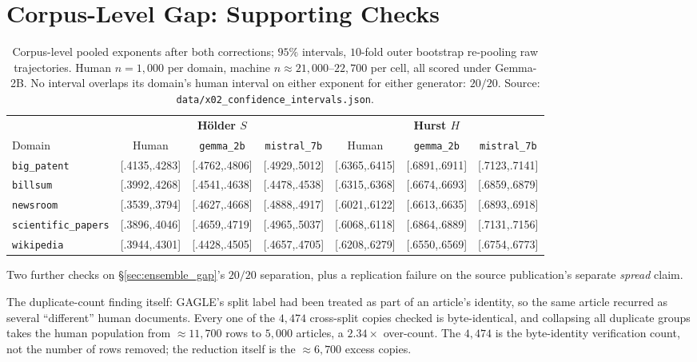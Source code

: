 \documentclass{article}
\newcommand{\Strue}{\ensuremath{S}}
\newcommand{\Htrue}{\ensuremath{H}}
\begin{document}
\section{Corpus-Level Gap: Supporting Checks}
\label{app:corpuschecks}

\begin{table}[h]
\centering
\caption{Corpus-level pooled exponents after both corrections; $95\%$ intervals,
$10$-fold outer bootstrap re-pooling raw trajectories. Human $n=1{,}000$ per domain,
machine $n\approx21{,}000$--$22{,}700$ per cell, all scored under Gemma-2B. No
interval overlaps its domain's human interval on either exponent for either
generator: $20/20$. Source: \texttt{data/x02\_confidence\_intervals.json}.}
\label{tab:x02}
\scriptsize
\setlength{\tabcolsep}{3.4pt}
\begin{tabular}{lccc@{\hskip 5mm}ccc}
\toprule
& \multicolumn{3}{c}{\textbf{H\"older \Strue}} & \multicolumn{3}{c}{\textbf{Hurst \Htrue}}\\
\cmidrule(lr){2-4}\cmidrule(lr){5-7}
Domain & Human & \texttt{gemma\_2b} & \texttt{mistral\_7b}
       & Human & \texttt{gemma\_2b} & \texttt{mistral\_7b}\\
\midrule
\texttt{big\_patent}       & [.4135,.4283] & [.4762,.4806] & [.4929,.5012] & [.6365,.6415] & [.6891,.6911] & [.7123,.7141]\\
\texttt{billsum}           & [.3992,.4268] & [.4541,.4638] & [.4478,.4538] & [.6315,.6368] & [.6674,.6693] & [.6859,.6879]\\
\texttt{newsroom}          & [.3539,.3794] & [.4627,.4668] & [.4888,.4917] & [.6021,.6122] & [.6613,.6635] & [.6893,.6918]\\
\texttt{scientific\_papers}& [.3896,.4046] & [.4659,.4719] & [.4965,.5037] & [.6068,.6118] & [.6864,.6889] & [.7131,.7156]\\
\texttt{wikipedia}         & [.3944,.4301] & [.4428,.4505] & [.4657,.4705] & [.6208,.6279] & [.6550,.6569] & [.6754,.6773]\\
\bottomrule
\end{tabular}
\end{table}


Two further checks on \S\ref{sec:ensemble_gap}'s $20/20$ separation, plus a
replication failure on the source publication's separate \emph{spread} claim.

The duplicate-count finding itself: GAGLE's split label had been treated as part of an
article's identity, so the same article recurred as several ``different''
human documents. Every one of the $4{,}474$ cross-split copies checked is
byte-identical, and collapsing all duplicate groups takes the human population
from $\approx11{,}700$ rows to $5{,}000$ articles, a $2.34\times$ over-count.
The $4{,}474$ is the byte-identity verification count, not the number of rows
removed; the reduction itself is the $\approx6{,}700$ excess copies.
\end{document}

